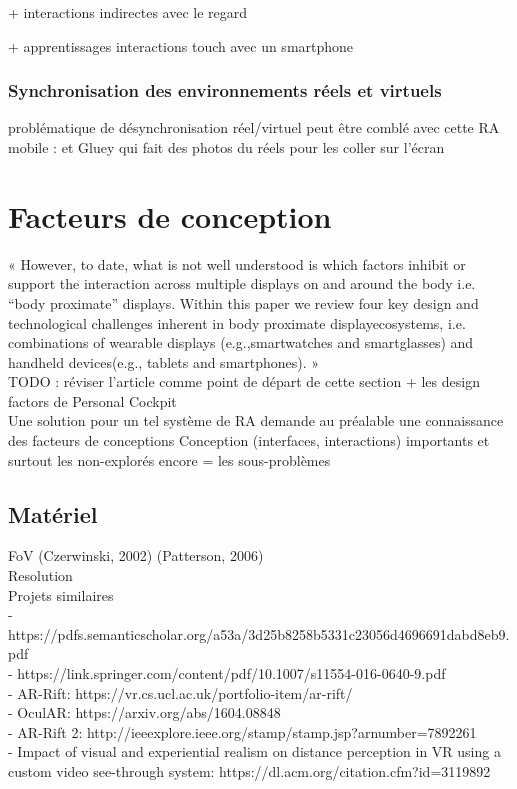 + interactions indirectes avec le regard

+ apprentissages interactions touch avec un smartphone


\subsubsection{Synchronisation des environnements réels et virtuels}
problématique de désynchronisation réel/virtuel peut être comblé avec cette RA mobile : \cite{Chalon2004} et Gluey qui fait des photos du réels pour les coller sur l'écran



\section{Facteurs de conception}
« However, to date, what is not well understood is which factors inhibit or support the interaction across multiple displays on and around the body i.e. “body proximate” displays. Within this paper we review four key design and technological challenges inherent in body proximate displayecosystems, i.e. combinations of wearable displays (e.g.,smartwatches and smartglasses) and handheld devices(e.g., tablets and smartphones). » \cite{GrubertKranzQuigley2015}\\
TODO : réviser l'article comme point de départ de cette section + les design factors de Personal Cockpit\\

Une solution pour un tel système de RA demande au préalable une connaissance des facteurs de conceptions
Conception (interfaces, interactions) importants et surtout les non-explorés encore = les sous-problèmes


\subsection{Matériel}
        FoV (Czerwinski, 2002) (Patterson, 2006) \cite{KishishitaKiyokawaOrloskyEtAl2014}\\

        Resolution\\

        Projets similaires\\
        - https://pdfs.semanticscholar.org/a53a/3d25b8258b5331c23056d4696691dabd8eb9.pdf\\
        - https://link.springer.com/content/pdf/10.1007/s11554-016-0640-9.pdf\\
        - AR-Rift: https://vr.cs.ucl.ac.uk/portfolio-item/ar-rift/\\
        - OculAR: https://arxiv.org/abs/1604.08848\\
        - AR-Rift 2: http://ieeexplore.ieee.org/stamp/stamp.jsp?arnumber=7892261\\
        - Impact of visual and experiential realism on distance perception in VR using a custom video see-through system: https://dl.acm.org/citation.cfm?id=3119892


